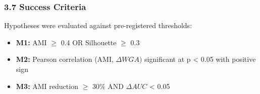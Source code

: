 \subsubsection{3.7 Success Criteria}

Hypotheses were evaluated against pre-registered thresholds:

\begin{itemize}
\item \textbf{M1:} AMI $\geq$ 0.4 OR Silhouette $\geq$ 0.3
\item \textbf{M2:} Pearson correlation (AMI, $\Delta WGA)$ significant at p < 0.05 with positive sign
\item \textbf{M3:} AMI reduction $\geq$ 30\% AND $\Delta AUC$ < 0.05
\end{itemize}
